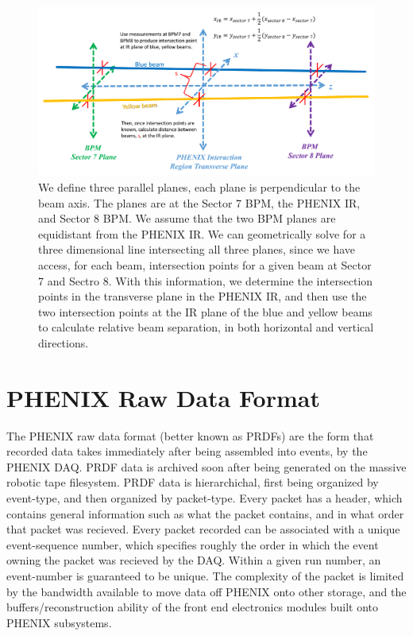 \begin{figure}[ht]
\begin{center}
\includegraphics[width=1.0\linewidth]{./figures/bpm_ir_beam_separation}
\caption{We define three parallel planes, each plane is perpendicular to the beam axis.
The planes are at the Sector 7 BPM, the PHENIX IR, and Sector 8 BPM. We assume that the
two BPM planes are equidistant from the PHENIX IR. We can geometrically solve for a three
dimensional line intersecting all three planes, since we have access, for each beam,
intersection points for a given beam at Sector 7 and Sectro 8. With this information, we
determine the intersection points in the transverse plane in the PHENIX IR, and then use
the two intersection points at the IR plane of the blue and yellow beams to calculate
relative beam separation, in both horizontal and vertical directions.}
\label{fig:bpm_ir_xing_cartoon}
\end{center}
\end{figure}

\section{PHENIX Raw Data Format} 

The PHENIX raw data format (better known as PRDFs) are the form that recorded
data takes immediately after being assembled into events, by the PHENIX DAQ.
PRDF data is archived soon after being generated on the massive robotic tape
filesystem. PRDF data is hierarchichal, first being organized by event-type, and
then organized by packet-type.  Every packet has a header, which contains
general information such as what the packet contains, and in what order that
packet was recieved. Every packet recorded can be associated with a unique
event-sequence number, which specifies roughly the order in which the event
owning the packet was recieved by the DAQ. Within a given run number, an
event-number is guaranteed to be unique. The complexity of the packet is limited
by the bandwidth available to move data off PHENIX onto other storage, and the
buffers/reconstruction ability of the front end electronics modules built onto
PHENIX subsystems.

